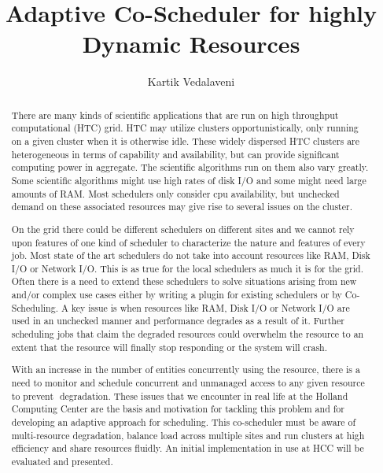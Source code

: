 \documentclass[ms,electronic,double]{nuthesis}
\begin{document}
\frontmatter
\title{Adaptive Co-Scheduler for highly Dynamic Resources}
\author{Kartik Vedalaveni}
\maketitle

\begin{abstract}
 There are many kinds of scientific applications that are run on high throughput computational (HTC) 
grid. HTC may utilize clusters opportunistically, only running on a given cluster 
when it is otherwise idle. These widely dispersed HTC clusters are heterogeneous in terms of 
capability and availability, but can provide significant computing power in aggregate. The scientific 
algorithms run on them also vary greatly. Some scientific algorithms might use high rates of disk I/O 
and some might need large amounts of RAM. Most schedulers only consider cpu availability, but 
unchecked demand on these associated resources may give rise to several issues on the cluster.

On the grid there could be different schedulers on different sites and we cannot rely upon features 
of one kind of scheduler to characterize the nature and features of every job. Most state of the art 
schedulers do not take into account resources like RAM, Disk I/O or Network I/O. This is as true for the
 local schedulers as much it is for the grid. Often there is a need to extend these schedulers to solve 
 situations arising from new and/or complex use cases either by writing a plugin for existing schedulers or by Co­Scheduling. 
 A key issue is when resources like RAM, Disk I/O or Network I/O are used in an unchecked manner and 
 performance degrades as a result of it. Further scheduling jobs that claim the degraded resources could 
 overwhelm the resource to an extent that the resource will finally stop responding or the system will crash. 

With an increase in the number of entities concurrently using the resource, there is a need to monitor and schedule concurrent and unmanaged access to any given resource to prevent  degradation. These issues that we encounter in real life at the Holland Computing Center 
are the basis and motivation for tackling this problem and for developing an adaptive approach for scheduling. 
This co-scheduler must be aware of multi­-resource degradation, balance load across multiple sites and 
run clusters at high efficiency and share resources fluidly. An initial implementation in use at HCC will 
be evaluated and presented. 

  
\end{abstract}
\end{document}
